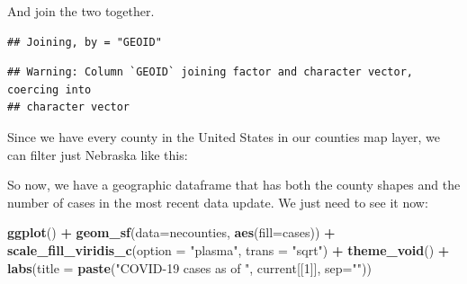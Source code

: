 \documentclass[]{book}
\newenvironment{Shaded}{\begin{snugshade}}{\end{snugshade}}
\newcommand{\DataTypeTok}[1]{\textcolor[rgb]{0.13,0.29,0.53}{#1}}
\newcommand{\DecValTok}[1]{\textcolor[rgb]{0.00,0.00,0.81}{#1}}
\newcommand{\KeywordTok}[1]{\textcolor[rgb]{0.13,0.29,0.53}{\textbf{#1}}}
\newcommand{\NormalTok}[1]{#1}
\newcommand{\OperatorTok}[1]{\textcolor[rgb]{0.81,0.36,0.00}{\textbf{#1}}}
\newcommand{\StringTok}[1]{\textcolor[rgb]{0.31,0.60,0.02}{#1}}
\begin{document}
And join the two together.

\begin{Shaded}
\end{Shaded}

\begin{verbatim}
## Joining, by = "GEOID"
\end{verbatim}

\begin{verbatim}
## Warning: Column `GEOID` joining factor and character vector, coercing into
## character vector
\end{verbatim}

Since we have every county in the United States in our counties map layer, we can filter just Nebraska like this:

\begin{Shaded}
\end{Shaded}

So now, we have a geographic dataframe that has both the county shapes and the number of cases in the most recent data update. We just need to see it now:

\begin{Shaded}
\begin{Highlighting}[]
\KeywordTok{ggplot}\NormalTok{() }\OperatorTok{+}\StringTok{ }
\StringTok{  }\KeywordTok{geom_sf}\NormalTok{(}\DataTypeTok{data=}\NormalTok{necounties, }\KeywordTok{aes}\NormalTok{(}\DataTypeTok{fill=}\NormalTok{cases)) }\OperatorTok{+}\StringTok{ }
\StringTok{  }\KeywordTok{scale_fill_viridis_c}\NormalTok{(}\DataTypeTok{option =} \StringTok{"plasma"}\NormalTok{, }\DataTypeTok{trans =} \StringTok{"sqrt"}\NormalTok{) }\OperatorTok{+}\StringTok{ }
\StringTok{  }\KeywordTok{theme_void}\NormalTok{() }\OperatorTok{+}\StringTok{ }
\StringTok{  }\KeywordTok{labs}\NormalTok{(}\DataTypeTok{title =} \KeywordTok{paste}\NormalTok{(}\StringTok{"COVID-19 cases as of "}\NormalTok{, current[[}\DecValTok{1}\NormalTok{]], }\DataTypeTok{sep=}\StringTok{""}\NormalTok{))}
\end{Highlighting}
\end{Shaded}
\end{document}
